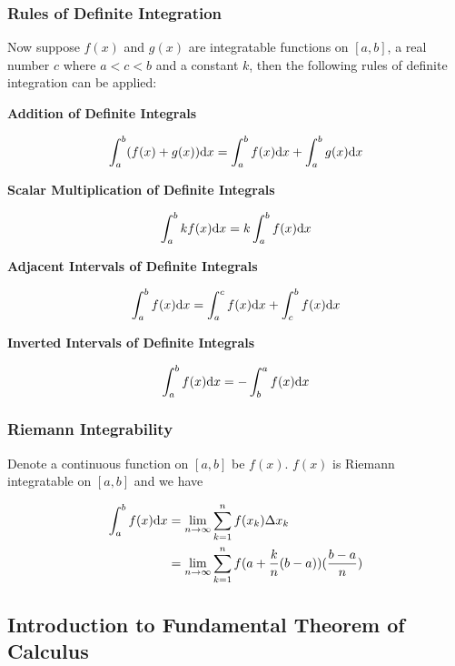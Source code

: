 \documentclass[a4paper,12pt]{article}
\begin{document}
\subsubsection{Rules of Definite Integration}
\begin{thm}
  Now suppose $f(x)$ and $g(x)$ are integratable functions on $[a,b]$, a real number $c$ where $a<c<b$ and a constant $k$, then the following rules of definite integration can be applied:

  \begin{alist}
    \item \textbf{Addition of Definite Integrals}

    $$\int_{a}^{b}(f(x)+g(x))\mathrm{d} x=\int_{a}^{b}f(x)\mathrm{d} x+\int_{a}^{b}g(x)\mathrm{d} x$$

    \item \textbf{Scalar Multiplication of Definite Integrals}

    $$\int_{a}^{b}kf(x)\mathrm{d} x=k\int_{a}^{b}f(x)\mathrm{d} x$$

    \item \textbf{Adjacent Intervals of Definite Integrals}

    $$\int_{a}^{b}f(x)\mathrm{d} x=\int_{a}^{c}f(x)\mathrm{d} x+\int_{c}^{b}f(x)\mathrm{d} x$$

    \item \textbf{Inverted Intervals of Definite Integrals}

    $$\int_{a}^{b}f(x)\mathrm{d} x=-\int_{b}^{a}f(x)\mathrm{d} x$$
  \end{alist}
\end{thm}

\subsubsection{Riemann Integrability}
\begin{thm}
  Denote a continuous function on $[a,b]$ be $f(x)$. $f(x)$ is Riemann integratable on $[a,b]$ and we have

  $$\begin{aligned}[t]
    \int_{a}^{b}f(x)\mathrm{d} x&=\lim_{n\to\infty}\sum_{k=1}^{n}f(x_{k})\Delta x_{k}\\
    &=\lim_{n\to\infty}\sum_{k=1}^{n}f(a+\frac{k}{n}(b-a))(\frac{b-a}{n})
  \end{aligned}$$
\end{thm}

\subsection{Introduction to Fundamental Theorem of Calculus}
\end{document}
